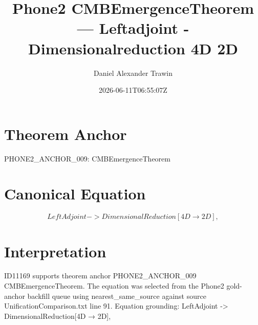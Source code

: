 \documentclass[11pt]{article}
\title{Phone2 CMBEmergenceTheorem — Leftadjoint - Dimensionalreduction 4D 2D}
\author{Daniel Alexander Trawin}
\date{2026-06-11T06:55:07Z}
\begin{document}
\maketitle
\section*{Theorem Anchor}
PHONE2_ANCHOR_009: CMBEmergenceTheorem
\section*{Canonical Equation}
\[
LeftAdjoint -> DimensionalReduction[4D → 2D],
\]
\section*{Interpretation}
ID11169 supports theorem anchor PHONE2_ANCHOR_009 CMBEmergenceTheorem. The equation was selected from the Phone2 gold-anchor backfill queue using nearest_same_source against source UnificationComparison.txt line 91. Equation grounding: LeftAdjoint -> DimensionalReduction[4D → 2D],
\end{document}
